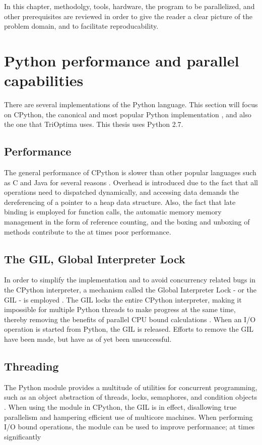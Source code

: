 In this chapter, methodolgy, tools, hardware, the program to be parallelized, and other prerequisites are reviewed in order
to give the reader a clear picture of the problem domain, and to facilitate reproducability.

\section{Python performance and parallel capabilities}
There are several implementations of the Python language. This section will focus on CPython, the canonical and most popular
Python implementation \cite{pythonimplementations_ppw}, and also the one that TriOptima uses. This thesis uses Python 2.7.

\subsection{Performance}
The general performance of CPython is slower than other popular languages such as C and Java for several
reasons \cite{barany_2014_python_pipd}. Overhead is introduced due to the fact that all operations need to dispatched dynamically,
and accessing data demands the dereferencing of a pointer to a heap data structure. Also, the fact that late binding is employed
for function calls, the automatic memory memory management in the form of reference counting, and the boxing and unboxing of
methods contribute to the at times poor performance.

\subsection{The GIL, Global Interpreter Lock}
In order to simplify the implementation and to avoid concurrency related bugs in the CPython interpreter,
a mechanism called the Global Interpreter Lock - or the GIL - is employed  \cite{palach_2014_parallel_ppwp}.
The GIL locks the entire CPython interpreter, making it impossible for multiple Python threads to make progress at
the same time, thereby removing the benefits of parallel CPU bound calculations
\cite{glossary_gp2d}. When an I/O operation is started from Python, the GIL is released.
Efforts to remove the GIL have been made, but have as of yet been unsuccessful.

\subsection{Threading}
The Python  module provides a multitude of utilities for concurrent programming, such as an object abstraction of
threads, locks, semaphores, and condition objects \cite{16_1thtip2d}. When using the  module in CPython, the GIL is in
effect, disallowing true parallelism and hampering efficient use of multicore machines. When performing I/O bound operations, the
 module can be used to improve performance; at times significantly \cite[p. 121-124]{slatkin_2015_effective_ep5swtwbp}

